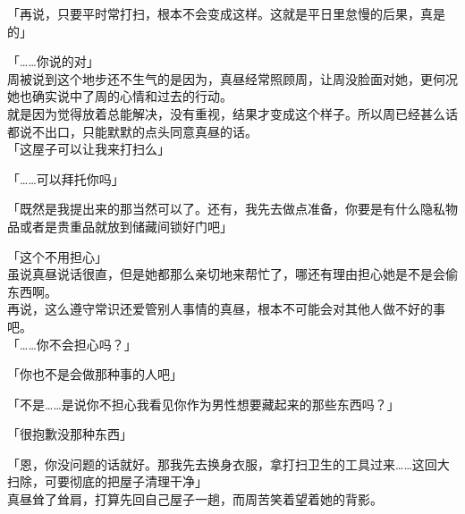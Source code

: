 「再说，只要平时常打扫，根本不会变成这样。这就是平日里怠慢的后果，真是的」

「……你说的对」\\

周被说到这个地步还不生气的是因为，真昼经常照顾周，让周没脸面对她，更何况她也确实说中了周的心情和过去的行动。\\

就是因为觉得放着总能解决，没有重视，结果才变成这个样子。所以周已经甚么话都说不出口，只能默默的点头同意真昼的话。\\

「这屋子可以让我来打扫么」

「……可以拜托你吗」

「既然是我提出来的那当然可以了。还有，我先去做点准备，你要是有什么隐私物品或者是贵重品就放到储藏间锁好门吧」

「这个不用担心」\\

虽说真昼说话很直，但是她都那么亲切地来帮忙了，哪还有理由担心她是不是会偷东西啊。\\

再说，这么遵守常识还爱管别人事情的真昼，根本不可能会对其他人做不好的事吧。\\

「……你不会担心吗？」

「你也不是会做那种事的人吧」

「不是……是说你不担心我看见你作为男性想要藏起来的那些东西吗？」

「很抱歉没那种东西」

「恩，你没问题的话就好。那我先去换身衣服，拿打扫卫生的工具过来……这回大扫除，可要彻底的把屋子清理干净」\\

真昼耸了耸肩，打算先回自己屋子一趟，而周苦笑着望着她的背影。

